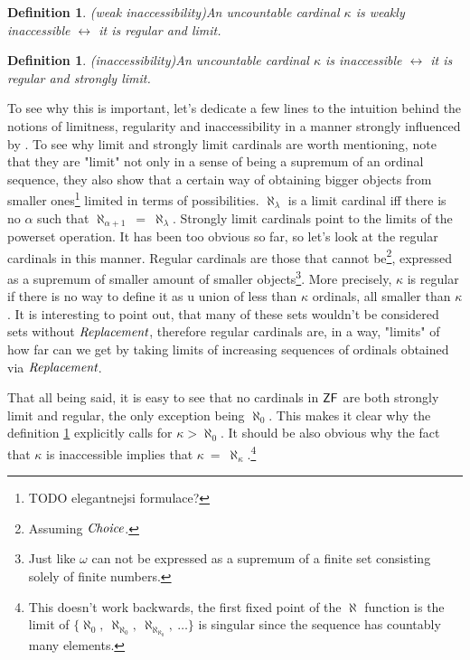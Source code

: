 \documentclass[12pt,a4paper]{article}
\newtheorem{definition}[theorem]{Definition}
\renewcommand{\iff}{\leftrightarrow}
\begin{document}
\begin{definition}(weak inaccessibility)\label{def:weakly_inaccessible}
An uncountable cardinal $\kappa$ is \emph{weakly inaccessible} $\iff$ it is \emph{regular} and \emph{limit}.
\end{definition}
\begin{definition}(inaccessibility)\label{def:inaccessible}
An uncountable cardinal $\kappa$ is \emph{inaccessible} $\iff$ it is \emph{regular} and \emph{strongly limit}.
\end{definition}

To see why this is important, let's dedicate a few lines to the intuition behind the notions of limitness, regularity and inaccessibility in a manner strongly influenced by \cite{Infinity_in_mind}. To see why limit and strongly limit cardinals are worth mentioning, note that they are "limit" not only in a sense of being a supremum of an ordinal sequence, they also show that a certain way of obtaining bigger objects from smaller ones\footnote{TODO elegantnejsi formulace?} limited in terms of possibilities. $\aleph_\lambda$ is a limit cardinal iff there is no $\alpha$ such that $\aleph_{\alpha+1}\ =\ \aleph_\lambda$. Strongly limit cardinals point to the limits of the powerset operation. It has been too obvious so far, so let's look at the regular cardinals in this manner. Regular cardinals are those that cannot be\footnote{Assuming $\emph{Choice}$.}, expressed as a supremum of smaller amount of smaller objects\footnote{Just like $\omega$ can not be expressed as a supremum of a finite set consisting solely of finite numbers.}. More precisely, $\kappa$ is regular if there is no way to define it as u union of less than $\kappa$ ordinals, all smaller than $\kappa$. It is interesting to point out, that many of these sets wouldn't be considered sets without $\emph{Replacement}$, therefore regular cardinals are, in a way, "limits" of how far can we get by taking limits of increasing sequences of ordinals obtained via $\emph{Replacement}$.

That all being said, it is easy to see that no cardinals in $\sf{ZF}$ are both strongly limit and regular, the only exception being $\aleph_0$. This makes it clear why the definition \ref{def:inaccessible} explicitly calls for $\kappa > \aleph_0$. It should be also obvious why the fact that $\kappa$ is inaccessible implies that $\kappa\ =\ \aleph_\kappa$.\footnote{This doesn't work backwards,  the first fixed point of the $\aleph$ function is the limit of $\{\aleph_0,\ \aleph_{\aleph_0},\ \aleph_{\aleph_{\aleph_0}},\ \ldots \}$ is singular since the sequence has countably many elements.}
\end{document}
